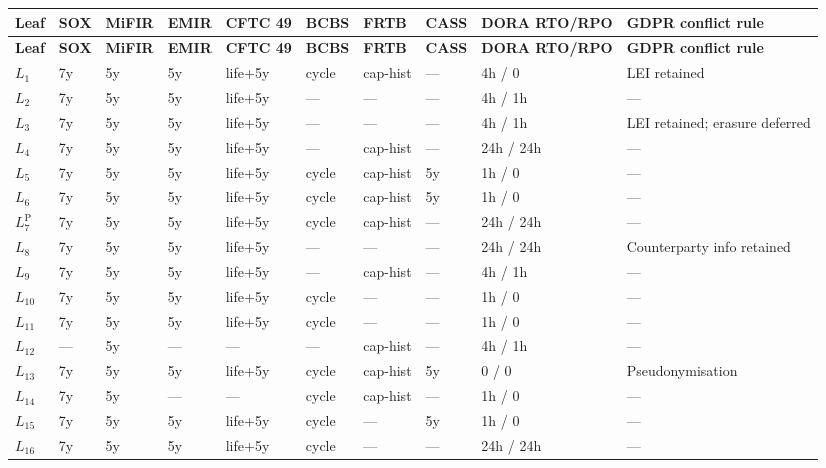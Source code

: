 \documentclass[11pt,a4paper]{article}
\begin{document}
\begin{center}
\renewcommand{\arraystretch}{1.05}
\begin{longtable}{@{}p{1.0cm}p{0.7cm}p{0.9cm}p{1.0cm}p{1.4cm}p{1.0cm}p{1.0cm}p{1.0cm}p{1.6cm}p{2.4cm}@{}}
\toprule
\textbf{Leaf} & \textbf{SOX} & \textbf{MiFIR} & \textbf{EMIR} & \textbf{CFTC 49} & \textbf{BCBS} & \textbf{FRTB} & \textbf{CASS} & \textbf{DORA RTO/RPO} & \textbf{GDPR conflict rule} \\
\midrule
\endfirsthead
\toprule
\textbf{Leaf} & \textbf{SOX} & \textbf{MiFIR} & \textbf{EMIR} & \textbf{CFTC 49} & \textbf{BCBS} & \textbf{FRTB} & \textbf{CASS} & \textbf{DORA RTO/RPO} & \textbf{GDPR conflict rule} \\
\midrule
\endhead
\bottomrule
\endfoot
$L_1$ & 7y & 5y & 5y & life+5y & cycle & cap-hist & --- & 4h / 0   & LEI retained \\
$L_2$ & 7y & 5y & 5y & life+5y & ---   & ---      & --- & 4h / 1h  & --- \\
$L_3$ & 7y & 5y & 5y & life+5y & ---   & ---      & --- & 4h / 1h  & LEI retained; erasure deferred \\
$L_4$ & 7y & 5y & 5y & life+5y & ---   & cap-hist & --- & 24h / 24h& --- \\
$L_5$ & 7y & 5y & 5y & life+5y & cycle & cap-hist & 5y  & 1h / 0   & --- \\
$L_6$ & 7y & 5y & 5y & life+5y & cycle & cap-hist & 5y  & 1h / 0   & --- \\
$L_7^{\mathrm{P}}$ & 7y & 5y & 5y & life+5y & cycle & cap-hist & --- & 24h / 24h & --- \\
$L_8$ & 7y & 5y & 5y & life+5y & ---   & ---      & --- & 24h / 24h& Counterparty info retained \\
$L_9$ & 7y & 5y & 5y & life+5y & ---   & cap-hist & --- & 4h / 1h  & --- \\
$L_{10}$ & 7y & 5y & 5y & life+5y & cycle & ---   & --- & 1h / 0   & --- \\
$L_{11}$ & 7y & 5y & 5y & life+5y & cycle & ---   & --- & 1h / 0   & --- \\
$L_{12}$ & --- & 5y & --- & ---  & ---   & cap-hist & --- & 4h / 1h & --- \\
$L_{13}$ & 7y & 5y & 5y & life+5y & cycle & cap-hist & 5y & 0 / 0   & Pseudonymisation \\
$L_{14}$ & 7y & 5y & --- & ---   & cycle & cap-hist & --- & 1h / 0   & --- \\
$L_{15}$ & 7y & 5y & 5y & life+5y & cycle & ---    & 5y & 1h / 0   & --- \\
$L_{16}$ & 7y & 5y & 5y & life+5y & cycle & ---    & --- & 24h / 24h& --- \\

\end{longtable}
\end{center}
\end{document}
